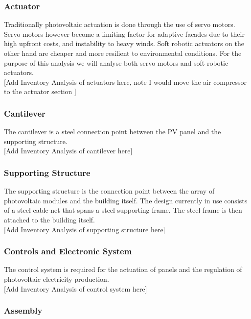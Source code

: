 \subsubsection*{Actuator}
Traditionally photovoltaic actuation is done through the use of servo motors. Servo motors however become a limiting factor for adaptive facades due to their high upfront costs, and instability to heavy winds. Soft robotic actuators on the other hand are cheaper and more resilient to environmental conditions\cite{Svetozarevic2014a}. For the purpose of this analysis we will analyse both servo motors and soft robotic actuators. \\

[Add Inventory Analysis of actuators here, note I would move the air compressor to the actuator section ]

\subsubsection*{Cantilever}
The cantilever is a steel connection point between the PV panel and the supporting structure.\\

[Add Inventory Analysis of cantilever here]

\subsubsection*{Supporting Structure}
The supporting structure is the connection point between the array of photovoltaic modules and the building itself. The design currently in use consists of a steel cable-net that spans a steel supporting frame. The steel frame is then attached to the building itself.\\

[Add Inventory Analysis of supporting structure here]

\subsubsection*{Controls and Electronic System}
The control system is required for the actuation of panels and the regulation of photovoltaic electricity production.\\

[Add Inventory Analysis of control system here]

\subsubsection*{Assembly}

